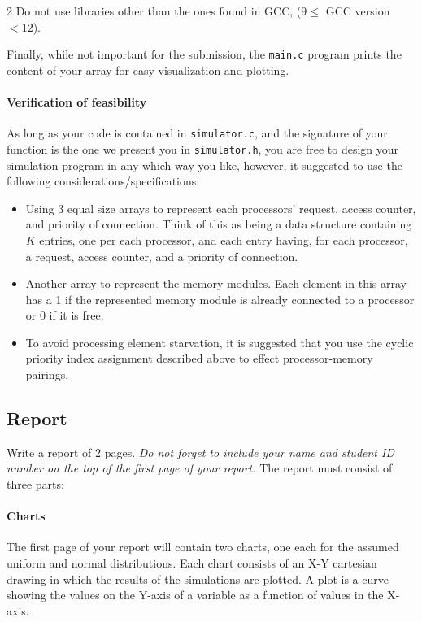 \documentclass[12pt]{article}
\begin{document}
\begin{multicols}{2}
  Do not use libraries other than the ones found in GCC, ($9\leq$ GCC version $<12$).

  Finally, while not important for the submission, the \texttt{main.c} program prints the content of your array for easy visualization and plotting.

  \paragraph{Verification of feasibility}
  As long as your code is contained in \texttt{simulator.c}, and the signature of your function is the one we present you in \texttt{simulator.h}, you are free to design your simulation program in any which way you like, however, it suggested to use the following considerations/specifications:
  \begin{itemize}
  \item Using 3 equal size arrays to represent each processors' request, access counter, and priority of connection. Think of this as being a data structure containing $K$ entries, one per each processor, and each entry having, for each processor, a request, access counter, and a priority of connection.
  \item Another array to represent the memory modules. Each element in this array has a 1 if the represented memory module is already connected to a processor or 0 if it is free.
  \item To avoid processing element starvation, it is suggested that you use the cyclic priority index assignment described above to effect processor-memory pairings.
  \end{itemize}



\subsection*{Report}
Write a report of 2 pages. {\em Do not forget to include your name and student ID number on the top of the first page of your report.} The report must consist of three parts:

\paragraph{Charts} The first page of your report will contain two charts, one each for the assumed uniform and normal distributions. Each chart consists of an X-Y cartesian drawing in which the results of the simulations are plotted. A plot is a curve showing the values on the Y-axis of a variable as a function of values in the X-axis.


\end{multicols}
\end{document}
